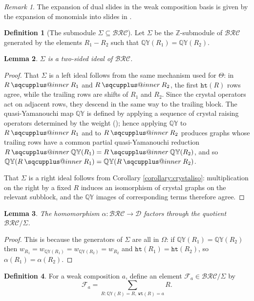 \documentclass[a4paper,fleqn]{cas-sc}
\makeatletter
\newcommand{\sqcupplus@inner}[2]{%
  \vcenter{\hbox{\ooalign{%
    \hfil$\m@th#1\sqcup$\hfil\cr
    \hfil\raisebox{0.15ex}{$\m@th#1\scriptscriptstyle+$}\hfil\cr
  }}}%
}
\newcommand{\sqcupplus}{\mathbin{\mathpalette\sqcupplus@inner\relax}}
\newtheorem{lemma}{Lemma}[subsection]
\theoremstyle{definition}
\newtheorem{definition}[lemma]{Definition}
\theoremstyle{remark}
\newtheorem*{remark}{Remark}
\numberwithin{equation}{subsection}
\newcommand{\wof}[1]{w_{#1}}
\newcommand{\wtt}{\mathtt{wt}}
\newcommand{\QY}{\ensuremath{\mathbb{QY}}}
\newcommand{\hr}{\mathtt{ht}}
\newcommand{\BRC}{\mathcal{BRC}}
\newcommand{\dcoma}{\mathcal{D}}
\makeatother
\begin{document}
\begin{remark}
The expansion of dual slides in the weak composition basis is given by the expansion of monomials into slides in \cite[Theorem~5.2]{nadeau2024ppartitions}.
\end{remark}

\begin{definition}[The submodule $\Sigma\subseteq \BRC$]
Let $\Sigma$ be the $\mathbb{Z}$-submodule of $\BRC$ generated by the elements $R_1-R_2$ such that $\QY(R_1)=\QY(R_2)$.
\end{definition}

\begin{lemma}\label{lemma:slideideal}
$\Sigma$ is a two-sided ideal of $\BRC$.
\end{lemma}
\begin{proof}
That $\Sigma$ is a left ideal follows from the same mechanism used for $\Theta$: in $R\sqcupplus R_1$ and $R\sqcupplus R_2$, the first $\hr(R)$ rows agree, while the trailing rows are shifts of $R_1$ and $R_2$. Since the crystal operators act on adjacent rows, they descend in the same way to the trailing block. The quasi-Yamanouchi map $\QY$ is defined by applying a sequence of crystal raising operators determined by the weight (\cite{assaf2017slide}); hence applying $\QY$ to $R\sqcupplus R_1$ and to $R\sqcupplus R_2$ produces graphs whose trailing rows have a common partial quasi-Yamanouchi reduction $R\sqcupplus \QY(R_1)=R\sqcupplus \QY(R_2)$, and so $\QY(R\sqcupplus R_1)=\QY(R\sqcupplus R_2)$.

That $\Sigma$ is a right ideal follows from Corollary \ref{corollary:crystaliso}: multiplication on the right by a fixed $R$ induces an isomorphism of crystal graphs on the relevant subblock, and the $\QY$ images of corresponding terms therefore agree.
\end{proof}

\begin{lemma}
The homomorphism $\alpha:\BRC\to\dcoma$ factors through the quotient $\BRC/\Sigma$.
\end{lemma}
\begin{proof}
This is because the generators of $\Sigma$ are all in $\Omega$: if $\QY(R_1)=\QY(R_2)$ then $\wof{R_1}=\wof{\QY(R_1)}=\wof{\QY(R_2)}=\wof{R_2}$ and $\hr(R_1)=\hr(R_2)$, so $\alpha(R_1)=\alpha(R_2)$.
\end{proof}

\begin{definition}
For a weak composition $a$, define an element $\mathcal{F}_a\in\BRC/\Sigma$ by
$$\mathcal{F}_a=\sum_{R: \QY(R)=R,\ \wtt(R)=a} R.$$
\end{definition}
\end{document}
